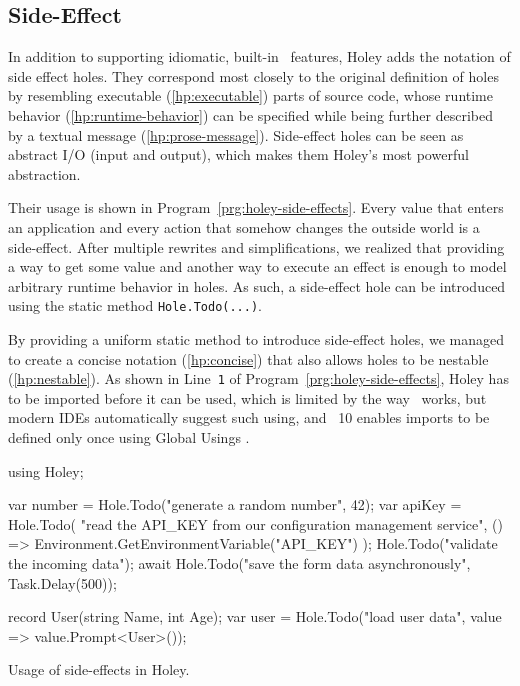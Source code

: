 \subsection{Side-Effect}
\label{sec:hole-type-side-effect}
In addition to supporting idiomatic, built-in \CS\ features, Holey adds the notation of side effect holes.
They correspond most closely to the original definition of holes by resembling executable (\ref{hp:executable}) parts of source code, whose runtime behavior (\ref{hp:runtime-behavior}) can be specified while being further described by a textual message (\ref{hp:prose-message}).
Side-effect holes can be seen as abstract I/O (input and output), which makes them Holey's most powerful abstraction.

Their usage is shown in Program~\ref{prg:holey-side-effects}.
Every value that enters an application and every action that somehow changes the outside world is a side-effect.
After multiple rewrites and simplifications, we realized that providing a way to get some value and another way to execute an effect is enough to model arbitrary runtime behavior in holes.
As such, a side-effect hole can be introduced using the static method \verb|Hole.Todo(...)|.

By providing a uniform static method to introduce side-effect holes, we managed to create a concise notation (\ref{hp:concise}) that also allows holes to be nestable (\ref{hp:nestable}).
As shown in Line~\verb|1| of Program~\ref{prg:holey-side-effects}, Holey has to be imported before it can be used, which is limited by the way \CS\ works, but modern IDEs automatically suggest such using, and \CS\ 10 enables imports to be defined only once using Global Usings \cite{koch_global_2021}.

\begin{program}[ht]
\begin{CsCode}
using Holey;

var number = Hole.Todo("generate a random number", 42);
var apiKey = Hole.Todo(
	"read the API_KEY from our configuration management service",
	() => Environment.GetEnvironmentVariable("API_KEY")
);
Hole.Todo("validate the incoming data");
await Hole.Todo("save the form data asynchronously", Task.Delay(500));

record User(string Name, int Age);
var user = Hole.Todo("load user data", value => value.Prompt<User>());
\end{CsCode}
\caption{Usage of side-effects in Holey.}
\label{prg:holey-side-effects}
\end{program}


